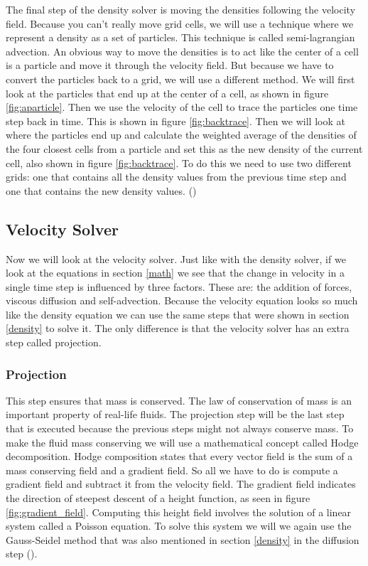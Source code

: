 \documentclass[a4paper,12pt,titlepage]{article}
\begin{document}
The final step of the density solver is moving the densities following the velocity
field. Because you can't really move grid cells, we will use a technique where we
represent a density as a set of particles. This technique is called semi-lagrangian
advection. An obvious way to move the densities is to act like the center of a
cell is a particle and move it through the velocity field. But because we have
to convert the particles back to a grid, we will use a different method. We will
first look at the particles that end up at the center of a cell, as shown in
figure \ref{fig:aparticle}. Then we use the velocity of the cell to trace the particles
one time step back in time. This is shown in figure \ref{fig:backtrace}. Then we will
look at where the particles end up and calculate the weighted average of the
densities of the four closest cells from a particle and set this as the new density
of the current cell, also shown in figure \ref{fig:backtrace}. To do this we need to use
two different grids: one that contains all the density values from the previous
time step and one that contains the new density values. (\cite{josstam})
 
\subsection{Velocity Solver} \label{velocity}
Now we will look at the velocity solver. Just like with the density solver, if we
look at the equations in section \ref{math} we see that the change in velocity
in a single time step is influenced by three factors. These are: the addition of
forces, viscous diffusion and self-advection. Because the velocity equation
looks so much like the density equation we can use the same steps that were shown
in section \ref{density} to solve it. The only difference is that the velocity
solver has an extra step called projection.

\subsubsection{Projection} \label{projectionstep}
This step ensures that mass is conserved. 
The law of conservation of mass is an important property of real-life fluids.
The projection step will be the last step that is executed because the previous
steps might not always conserve mass. To make the fluid mass conserving we will
use a mathematical concept called Hodge decomposition. Hodge composition states
that every vector field is the sum of a mass conserving field and a gradient field.
So all we have to do is compute a gradient field and subtract it from the velocity
field. The gradient field indicates the direction of steepest descent of a height function, as seen in figure \ref{fig:gradient_field}.
Computing this height field involves the solution of a linear system called a Poisson equation.
To solve this system we will we again use the Gauss-Seidel method that was also mentioned in section \ref{density} in the diffusion step (\cite{josstam}).
\end{document}
